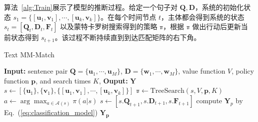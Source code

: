 算法~\ref{alg:Train}展示了模型的推断过程。给定一个句子对 $\mathbf{Q}, \mathbf{D}$，系统的初始化状态 $s_1=\{[\mathbf{u}_1,\mathbf{v}_1], \cdots, [\mathbf{u}_k, \mathbf{v}_k]\}$。在每个时间节点 $t$，主体都会得到系统的状态 $s_t=[\mathbf{Q}_t, \mathbf{D}_t, \mathbf{F}_t]$ 以及蒙特卡罗树搜索得到的策略 $\mathbb{\pi}$，根据 $\mathbb{\pi}$ 做出行动后更新当前状态得到 $s_{t+1}$。该过程不断持续直到到达匹配矩阵的右下角。

\begin{algorithm}[!htbp]
\caption{Text MM-Match}\label{alg:RLRank_MCTS}
\renewcommand{\algorithmicrequire}{\textbf{Input:}}
\renewcommand{\algorithmicensure}{\textbf{Output:}}
\begin{algorithmic}[1]
\STATE \textbf{Input:} sentence pair $\mathbf{Q}=\{\mathbf{u}_1, \cdots, \mathbf{u}_M\}$, $\mathbf{D}=\{\mathbf{w}_1, \cdots, \mathbf{w}_M\}$, value function $V$, policy function $\mathbf{p}$, and search times $K$,
\STATE \textbf{Ouput:} $\mathbf{Y}$
\STATE $s \leftarrow [\{\mathbf{u}_1\}, \{\mathbf{v}_1\}, \{[\mathbf{u}_1,\mathbf{v}_1], \cdots, [\mathbf{u}_k, \mathbf{v}_k]\}]$
  \STATE $\mathbb{\pi} \leftarrow \mathrm{TreeSearch}(s, V, \mathbf{p}, K)$
  \STATE $a \leftarrow \arg\max_{a\in\mathcal{A}(s)} \pi(a|s)$
  \STATE $s \leftarrow [s.\mathbf{Q}_{t+1}, s.\mathbf{D}_{t+1}, s.\mathbf{F}_{t+1}]$
\ENDWHILE
\STATE compute $\mathbf{Y}_p$ by Eq.~(\ref{eq:classification_model})
\STATE \RETURN $\mathbf{Y_p}$
\end{algorithmic}
\end{algorithm}


